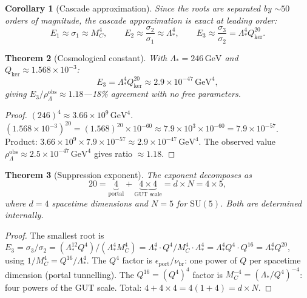 \documentclass[12pt]{article}
\theoremstyle{plain}
\newtheorem{theorem}{Theorem}[section]
\newtheorem{corollary}[theorem]{Corollary}
\theoremstyle{definition}
\numberwithin{equation}{section}
\newcommand{\br}{\mathrm{br}}
\newcommand{\kker}{\mathrm{ker}}
\begin{document}
\begin{corollary}[Cascade approximation]\label{cor:cascade}
Since the roots are separated by $\sim 50$ orders of magnitude, the cascade approximation is exact at leading order:
\begin{equation}
E_1\approx\sigma_1\approx M_C^4,\qquad
E_2\approx\frac{\sigma_2}{\sigma_1}\approx\Lambda_*^4,\qquad
\boxed{E_3\approx\frac{\sigma_3}{\sigma_2}=\Lambda_*^4 Q_{\kker}^{20}.}
\end{equation}
\end{corollary}

\begin{theorem}[Cosmological constant]\label{thm:cosmoconst}
With $\Lambda_*=246\,\mathrm{GeV}$ and $Q_{\kker}\approx 1.568\times 10^{-3}$:
\begin{equation}
E_3=\Lambda_*^4 Q_{\kker}^{20}\approx 2.9\times 10^{-47}\,\mathrm{GeV}^4,
\end{equation}
giving $E_3/\rho_\Lambda^{\mathrm{obs}}\approx 1.18$---18\% agreement with no free parameters.
\end{theorem}

\begin{proof}
$(246)^4\approx 3.66\times 10^9\,\mathrm{GeV}^4$.  $(1.568\times 10^{-3})^{20}=(1.568)^{20}\times 10^{-60}\approx 7.9\times 10^3\times 10^{-60}=7.9\times 10^{-57}$.  Product: $3.66\times 10^9\times 7.9\times 10^{-57}\approx 2.9\times 10^{-47}\,\mathrm{GeV}^4$.  The observed value $\rho_\Lambda^{\mathrm{obs}}\approx 2.5\times 10^{-47}\,\mathrm{GeV}^4$ gives ratio $\approx 1.18$.
\end{proof}

\begin{theorem}[Suppression exponent]\label{thm:exponent}
The exponent decomposes as
\begin{equation}
20 = \underbrace{4}_{\text{portal}} + \underbrace{4\times 4}_{\text{GUT scale}} = d\times N = 4\times 5,
\end{equation}
where $d=4$ spacetime dimensions and $N=5$ for $\mathrm{SU}(5)$.  Both are determined internally.
\end{theorem}

\begin{proof}
The smallest root is $E_3=\sigma_3/\sigma_2=(\Lambda_*^{12}Q^4)/(\Lambda_*^4 M_C^4)=\Lambda_*^4\cdot Q^4/M_C^4\cdot\Lambda_*^4=\Lambda_*^4 Q^4\cdot Q^{16}=\Lambda_*^4 Q^{20}$, using $1/M_C^4=Q^{16}/\Lambda_*^4$.  The $Q^4$ factor is $\epsilon_{\mathrm{port}}/\nu_{\br}$: one power of $Q$ per spacetime dimension (portal tunnelling).  The $Q^{16}=(Q^4)^4$ factor is $M_C^{-4}=(\Lambda_*/Q^4)^{-4}$: four powers of the GUT scale.  Total: $4+4\times 4=4(1+4)=d\times N$.
\end{proof}
\end{document}
